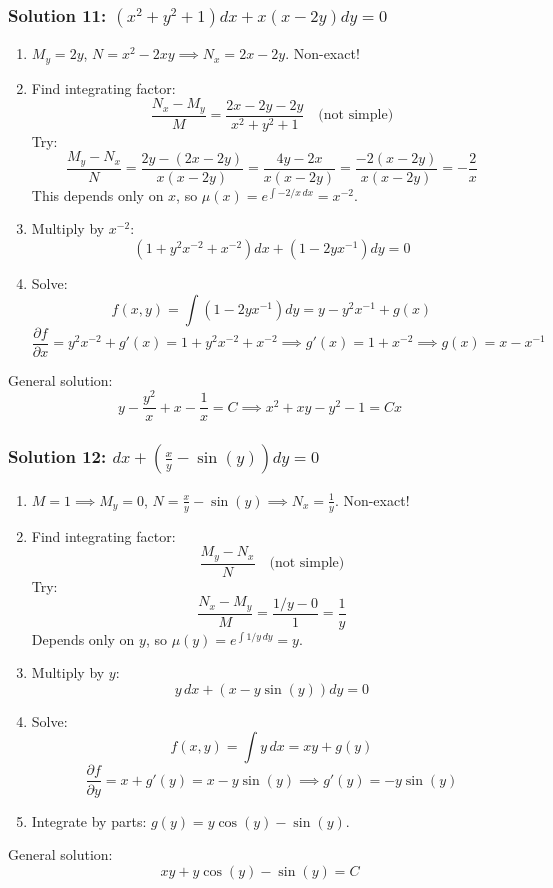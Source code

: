 \documentclass[11pt,letterpaper]{article}
\begin{document}
\subsubsection*{Solution 11: $(x^2 + y^2 + 1)dx + x(x - 2y)dy = 0$}
\begin{enumerate}
    \item $M_y = 2y$, $N = x^2 - 2xy \implies N_x = 2x - 2y$. Non-exact!
    \item Find integrating factor:
    \[ \frac{N_x - M_y}{M} = \frac{2x - 2y - 2y}{x^2+y^2+1} \quad \text{(not simple)} \]
    Try:
    \[ \frac{M_y - N_x}{N} = \frac{2y - (2x - 2y)}{x(x-2y)} = \frac{4y - 2x}{x(x-2y)} = \frac{-2(x-2y)}{x(x-2y)} = -\frac{2}{x} \]
    This depends only on $x$, so $\mu(x) = e^{\int -2/x \, dx} = x^{-2}$.
    \item Multiply by $x^{-2}$:
    \[ \left(1 + y^2 x^{-2} + x^{-2}\right)dx + \left(1 - 2y x^{-1}\right)dy = 0 \]
    \item Solve:
    \[ f(x,y) = \int (1 - 2y x^{-1}) dy = y - y^2 x^{-1} + g(x) \]
    \[ \frac{\partial f}{\partial x} = y^2 x^{-2} + g'(x) = 1 + y^2 x^{-2} + x^{-2} \implies g'(x) = 1 + x^{-2} \implies g(x) = x - x^{-1} \]
\end{enumerate}
General solution:
\[ y - \frac{y^2}{x} + x - \frac{1}{x} = C \implies x^2 + xy - y^2 - 1 = Cx \]

\subsubsection*{Solution 12: $dx + \left(\frac{x}{y} - \sin(y)\right)dy = 0$}
\begin{enumerate}
    \item $M = 1 \implies M_y = 0$, $N = \frac{x}{y} - \sin(y) \implies N_x = \frac{1}{y}$. Non-exact!
    \item Find integrating factor:
    \[ \frac{M_y - N_x}{N} \quad \text{(not simple)} \]
    Try:
    \[ \frac{N_x - M_y}{M} = \frac{1/y - 0}{1} = \frac{1}{y} \]
    Depends only on $y$, so $\mu(y) = e^{\int 1/y \, dy} = y$.
    \item Multiply by $y$:
    \[ y\,dx + (x - y\sin(y))dy = 0 \]
    \item Solve:
    \[ f(x,y) = \int y \, dx = xy + g(y) \]
    \[ \frac{\partial f}{\partial y} = x + g'(y) = x - y\sin(y) \implies g'(y) = -y\sin(y) \]
    \item Integrate by parts: $g(y) = y\cos(y) - \sin(y)$.
\end{enumerate}
General solution:
\[ xy + y\cos(y) - \sin(y) = C \]
\end{document}
